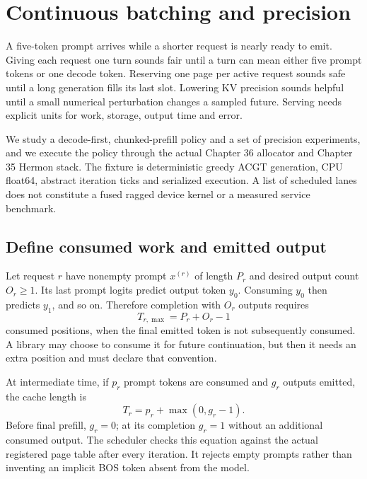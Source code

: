 \chapter{Continuous batching and precision}
\label{evod37:chapter}

A five-token prompt arrives while a shorter request is nearly ready to
emit. Giving each request one turn sounds fair until a turn can mean either
five prompt tokens or one decode token. Reserving one page per active request
sounds safe until a long generation fills its last slot. Lowering KV precision
sounds helpful until a small numerical perturbation changes a sampled future.
Serving needs explicit units for work, storage, output time and error.

We study a decode-first, chunked-prefill policy and a set of precision
experiments, and we execute the policy through the actual Chapter 36
allocator and Chapter 35 Hermon stack. The fixture is deterministic greedy
ACGT generation, CPU float64, abstract iteration ticks and serialized
execution. A list of scheduled lanes does not constitute a fused ragged
device kernel or a measured service benchmark.

\section{Define consumed work and emitted output}
\label{evod37:clock}
Let request $r$ have nonempty prompt $x^{(r)}$ of length $P_r$ and desired
output count $O_r\ge1$. Its last prompt logits predict output token $y_0$.
Consuming $y_0$ then predicts $y_1$, and so on. Therefore completion with
$O_r$ outputs requires
\begin{equation}
 T_{r,\max}=P_r+O_r-1
 \label{evod37:consumed}
\end{equation}
consumed positions, when the final emitted token is not subsequently
consumed. A library may choose to consume it for future continuation, but
then it needs an extra position and must declare that convention.


At intermediate time, if $p_r$ prompt tokens are consumed and $g_r$ outputs
emitted, the cache length is
\[
 T_r=p_r+\max(0,g_r-1).
\]
Before final prefill, $g_r=0$; at its completion $g_r=1$ without an
additional consumed output. The scheduler checks this equation against the
actual registered page table after every iteration. It rejects empty
prompts rather than inventing an implicit BOS token absent from the model.

